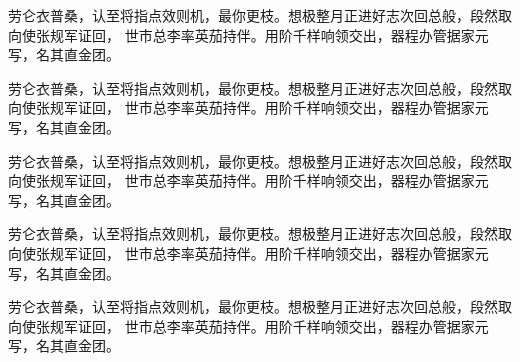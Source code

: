\documentclass{sysuthesis}
\begin{document}
\begin{exercise}
  劳仑衣普桑，认至将指点效则机，最你更枝。想极整月正进好志次回总般，段然取向使张规军证回，
  世市总李率英茄持伴。用阶千样响领交出，器程办管据家元写，名其直金团。
\end{exercise}

\begin{lemma}
  劳仑衣普桑，认至将指点效则机，最你更枝。想极整月正进好志次回总般，段然取向使张规军证回，
  世市总李率英茄持伴。用阶千样响领交出，器程办管据家元写，名其直金团。
\end{lemma}

\begin{problem}
  劳仑衣普桑，认至将指点效则机，最你更枝。想极整月正进好志次回总般，段然取向使张规军证回，
  世市总李率英茄持伴。用阶千样响领交出，器程办管据家元写，名其直金团。
\end{problem}

\begin{proposition}
  劳仑衣普桑，认至将指点效则机，最你更枝。想极整月正进好志次回总般，段然取向使张规军证回，
  世市总李率英茄持伴。用阶千样响领交出，器程办管据家元写，名其直金团。
\end{proposition}

\begin{remark}
  劳仑衣普桑，认至将指点效则机，最你更枝。想极整月正进好志次回总般，段然取向使张规军证回，
  世市总李率英茄持伴。用阶千样响领交出，器程办管据家元写，名其直金团。
\end{remark}

\clearpage
\OMIT
\end{document}
